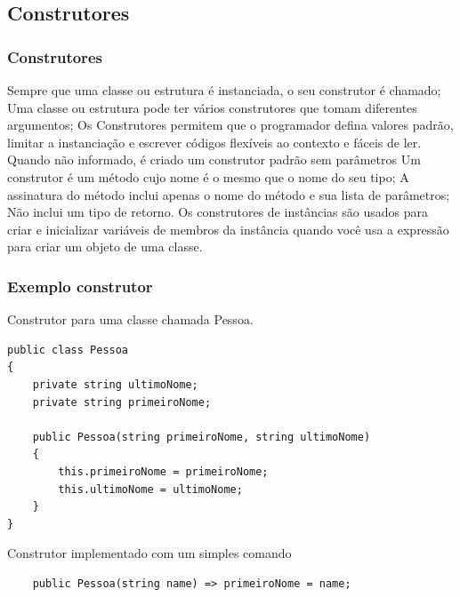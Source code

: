 \documentclass{beamer}
\begin{document}
\subsection{Construtores}
\begin{frame}
\frametitle{Construtores}
\begin{outline}
	\1 Sempre que uma classe ou estrutura é instanciada, o seu construtor é chamado;
	\1 Uma classe ou estrutura pode ter vários construtores que tomam diferentes argumentos;
	\1 Os Construtores permitem que o programador defina valores padrão, limitar a instanciação e escrever códigos flexíveis ao contexto e fáceis de ler.
	\1 Quando não informado, é criado um construtor padrão sem parâmetros
	\1 Um construtor é um método cujo nome é o mesmo que o nome do seu tipo;
	\1 A assinatura do método inclui apenas o nome do método e sua lista de parâmetros; 
	\2 Não inclui um tipo de retorno. 	
\1 Os construtores de instâncias são usados para criar e inicializar variáveis de membros da instância quando você usa a expressão  para criar um objeto de uma classe.
\end{outline}
\end{frame}


\begin{frame}[fragile]
\frametitle{Exemplo construtor}
\begin{outline}
	\1 Construtor para uma classe chamada Pessoa.
\2 [Ex.:] \begin{lstlisting}
public class Pessoa
{
	private string ultimoNome;
	private string primeiroNome;
	
	public Pessoa(string primeiroNome, string ultimoNome)
	{
		this.primeiroNome = primeiroNome;
		this.ultimoNome = ultimoNome;
	}
}
\end{lstlisting}
\1 Construtor implementado com um simples comando
\2 [Ex.:] \begin{lstlisting}
	public Pessoa(string name) => primeiroNome = name;
\end{lstlisting}
\end{outline}
\end{frame}
\end{document}
